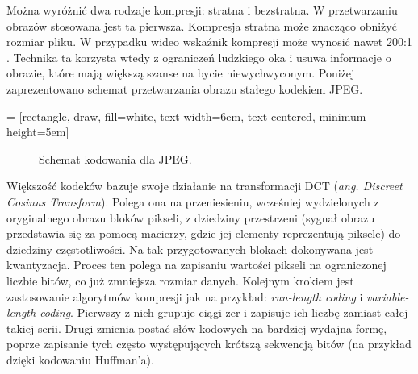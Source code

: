 Można wyróżnić dwa rodzaje kompresji: stratna i bezstratna. W przetwarzaniu obrazów stosowana jest ta pierwsza. Kompresja stratna może znacząco obniżyć rozmiar pliku. W przypadku wideo wskaźnik kompresji może wynosić nawet 200:1 \cite{compression_rate} . Technika ta korzysta wtedy z ograniczeń ludzkiego oka i usuwa informacje o obrazie, które mają większą szanse na bycie niewychwyconym. Poniżej zaprezentowano schemat przetwarzania obrazu stałego kodekiem JPEG.

 = [rectangle, draw, fill=white, text width=6em, text centered, minimum height=5em]

\begin{center}
\begin{figure}
\centering
\caption{Schemat kodowania dla JPEG.}
\end{figure}
\end{center}


Większość kodeków bazuje swoje działanie na transformacji DCT (\emph{ang. Discreet Cosinus Transform}). Polega ona na przeniesieniu, wcześniej wydzielonych z oryginalnego obrazu bloków pikseli, z dziedziny przestrzeni (sygnał obrazu przedstawia się za pomocą macierzy, gdzie jej elementy reprezentują piksele) do dziedziny częstotliwości. Na tak przygotowanych blokach dokonywana jest kwantyzacja. Proces ten polega na zapisaniu  wartości pikseli na ograniczonej liczbie bitów, co już zmniejsza rozmiar danych. Kolejnym krokiem jest zastosowanie algorytmów kompresji jak na przykład: \emph{run-length coding} i \emph{variable-length coding}. Pierwszy z nich grupuje ciągi zer i zapisuje ich liczbę zamiast całej takiej serii. Drugi zmienia postać słów kodowych na bardziej wydajna formę, poprze zapisanie tych często występujących krótszą sekwencją bitów \cite{kodowanie} (na przykład dzięki kodowaniu Huffman'a). 

